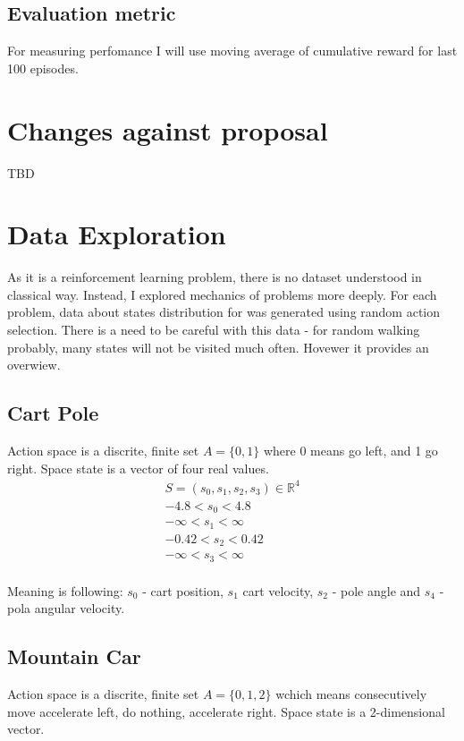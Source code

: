 \documentclass[12pt]{article}
\begin{document}
\subsection{Evaluation metric}

For measuring perfomance I will use moving average of cumulative reward for last 100 episodes.

\section{Changes against proposal}
TBD

\section{Data Exploration}

As it is a reinforcement learning problem, there is no dataset understood in classical way. Instead, I explored mechanics of problems more deeply. For each problem, data about states distribution for was generated using random action selection. There is a need to be careful with this data - for random walking probably, many states will not be visited much often. Hovewer it provides an overwiew.

\subsection{Cart Pole}

Action space is a discrite, finite set $A = \{0,1\}$ where 0 means go left, and 1 go right.
Space state is a vector of four real values. 
\begin{multline}
 S = (s_0, s_1, s_2, s_3) \in \mathbb{R}^4 \\
-4.8 < s_0 < 4.8 \\
-\infty < s_1 < \infty \\
-0.42 < s_2 < 0.42 \\
-\infty < s_3 < \infty \\
\end{multline}

Meaning is following: $s_0$ - cart position, $s_1$ cart velocity, $s_2$ - pole angle and $s_4$ - pola angular velocity.


\subsection{Mountain Car}
Action space is a discrite, finite set $A = \{0,1,2\}$ wchich means consecutively move accelerate left, do nothing, accelerate right. Space state is a 2-dimensional vector.
\end{document}

